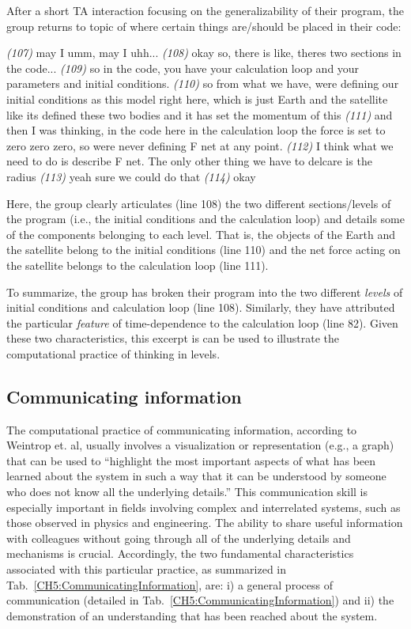 \documentclass{msuphddissertation}
\begin{document}
\begin{doublespace}
After a short TA interaction focusing on the generalizability of their program, the group returns to topic of where certain things are/should be placed in their code: \begin{description}
\SB \textit{(107)} may I umm, may I uhh...
\SB \textit{(108)} okay so, there is like, theres two sections in the code...   
\SB \textit{(109)} so in the code, you have your calculation loop and your parameters and initial conditions.  
\SB \textit{(110)} so from what we have, were defining our initial conditions as this model right here, which is just Earth and the satellite like its defined these two bodies and it has set the momentum of this    
\SB \textit{(111)} and then I was thinking, in the code here {in the calculation loop} the force is set to zero zero zero, so were never defining F net at any point.
\SB \textit{(112)} I think what we need to do is describe F net. The only other thing we have to delcare is the radius    
\SC \textit{(113)} yeah sure we could do that  
\SD \textit{(114)} okay
\end{description}  Here, the group clearly articulates (line 108) the two different sections/levels of the program (i.e., the initial conditions and the calculation loop) and details some of the components belonging to each level.  That is, the objects of the Earth and the satellite belong to the initial conditions (line 110) and the net force acting on the satellite belongs to the calculation loop (line 111).

To summarize, the group has broken their program into the two different \textit{levels} of initial conditions and calculation loop (line 108).  Similarly, they have attributed the particular \textit{feature} of time-dependence to the calculation loop (line 82).  Given these two characteristics, this excerpt is can be used to illustrate the computational practice of thinking in levels.

%
%
%
%
%
%
%
%
%
%
%
%
%
%
%
%

\subsection{Communicating information}

The computational practice of communicating information, according to Weintrop et. al, usually involves a visualization or representation (e.g., a graph) that can be used to ``highlight the most important aspects of what has been learned about the system in such a way that it can be understood by someone who does not know all the underlying details.''  This communication skill is especially important in fields involving complex and interrelated systems, such as those observed in physics and engineering.  The ability to share useful information with colleagues without going through all of the underlying details and mechanisms is crucial.  Accordingly, the two fundamental characteristics associated with this particular practice, as summarized in Tab.~\ref{CH5:CommunicatingInformation}, are: i) a general process of communication (detailed in Tab.~\ref{CH5:CommunicatingInformation}) and ii) the demonstration of an understanding that has been reached about the system.


\end{doublespace}
\end{document}
